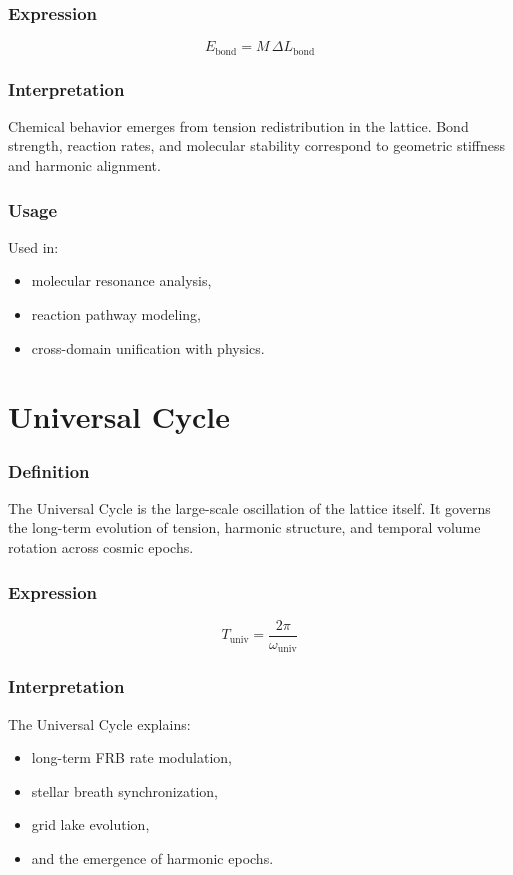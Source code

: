 \documentclass[12pt,oneside]{book}
\begin{document}
\subsubsection{Expression}


\[
E_{\mathrm{bond}} = M \, \Delta L_{\mathrm{bond}}
\]



\subsubsection{Interpretation}
Chemical behavior emerges from tension redistribution in the lattice.  
Bond strength, reaction rates, and molecular stability correspond to geometric stiffness and
harmonic alignment.

\subsubsection{Usage}
Used in:
\begin{itemize}
    \item molecular resonance analysis,
    \item reaction pathway modeling,
    \item cross-domain unification with physics.
\end{itemize}


\section{Universal Cycle}

\subsubsection{Definition}
The Universal Cycle is the large-scale oscillation of the lattice itself. It governs the long-term
evolution of tension, harmonic structure, and temporal volume rotation across cosmic epochs.

\subsubsection{Expression}


\[
T_{\mathrm{univ}} = \frac{2\pi}{\omega_{\mathrm{univ}}}
\]



\subsubsection{Interpretation}
The Universal Cycle explains:
\begin{itemize}
    \item long-term FRB rate modulation,
    \item stellar breath synchronization,
    \item grid lake evolution,
    \item and the emergence of harmonic epochs.
\end{itemize}
\end{document}
